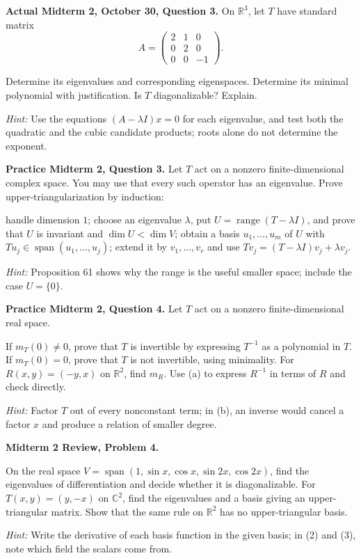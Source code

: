 \begin{prob}\textbf{Actual Midterm 2, October 30, Question 3.} On $\mathbb R^3$, let $T$ have standard matrix
\[ A=\begin{pmatrix}2&1&0\\0&2&0\\0&0&-1\end{pmatrix}. \]
\begin{enumerate}[(a)]
  \ii Determine its eigenvalues and corresponding eigenspaces.
  \ii Determine its minimal polynomial with justification.
  \ii Is $T$ diagonalizable? Explain.
\end{enumerate}
\emph{Hint:} Use the equations $(A-\lambda I)x=0$ for each eigenvalue, and test both the quadratic and the cubic candidate products; roots alone do not determine the exponent.
\end{prob}
\begin{prob}\textbf{Practice Midterm 2, Question 3.} Let $T$ act on a nonzero finite-dimensional complex space. You may use that every such operator has an eigenvalue. Prove upper-triangularization by induction:
\begin{enumerate}[(a)]
  \ii handle dimension $1$;
  \ii choose an eigenvalue $\lambda$, put $U=\operatorname{range}(T-\lambda I)$, and prove that $U$ is invariant and $\dim U<\dim V$;
  \ii obtain a basis $u_1,\ldots,u_m$ of $U$ with $Tu_j\in\operatorname{span}(u_1,\ldots,u_j)$;
  \ii extend it by $v_1,\ldots,v_r$ and use $Tv_j=(T-\lambda I)v_j+\lambda v_j$.
\end{enumerate}
\emph{Hint:} Proposition 61 shows why the range is the useful smaller space; include the case $U=\{0\}$.
\end{prob}
\begin{prob}\textbf{Practice Midterm 2, Question 4.} Let $T$ act on a nonzero finite-dimensional real space.
\begin{enumerate}[(a)]
  \ii If $m_T(0)\ne0$, prove that $T$ is invertible by expressing $T^{-1}$ as a polynomial in $T$.
  \ii If $m_T(0)=0$, prove that $T$ is not invertible, using minimality.
  \ii For $R(x,y)=(-y,x)$ on $\mathbb R^2$, find $m_R$.
  \ii Use (a) to express $R^{-1}$ in terms of $R$ and check directly.
\end{enumerate}
\emph{Hint:} Factor $T$ out of every nonconstant term; in (b), an inverse would cancel a factor $x$ and produce a relation of smaller degree.
\end{prob}
\begin{prob}\textbf{Midterm 2 Review, Problem 4.}
\begin{enumerate}[(1)]
  \ii On the real space $V=\operatorname{span}(1,\sin x,\cos x,\sin2x,\cos2x)$, find the eigenvalues of differentiation and decide whether it is diagonalizable.
  \ii For $T(x,y)=(y,-x)$ on $\mathbb C^2$, find the eigenvalues and a basis giving an upper-triangular matrix.
  \ii Show that the same rule on $\mathbb R^2$ has no upper-triangular basis.
\end{enumerate}
\emph{Hint:} Write the derivative of each basis function in the given basis; in (2) and (3), note which field the scalars come from.
\end{prob}
